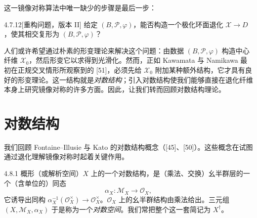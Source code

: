 这一镜像对称算法中唯一缺少的步骤是最后一步：

\begin{question}{4.7.12}[重构问题，版本 II]
给定 $(B,\mathcal{P},\varphi)$，能否构造一个极化环面退化 $\mathcal{X}\to D$，使其相交复形为 $(B,\mathcal{P},\varphi)$？
\end{question}

人们或许希望通过朴素的形变理论来解决这个问题：由数据 $(B,\mathcal{P},\varphi)$ 构造中心纤维 $\mathcal{X}_0$，然后形变它以求得到光滑化。然而，正如 Kawamata 与 Namikawa 最初在正规交叉情形所观察到的 [51]，必须先给 $\mathcal{X}_0$ 附加某种额外结构，它才具有良好的形变理论。这一结构就是\emph{对数结构}；引入对数结构使我们能够直接在退化纤维本身上研究镜像对称的许多方面。因此，让我们转而回顾对数结构理论。

\section{对数结构}
我们回顾 Fontaine--Illusie 与 Kato 的对数结构概念（[45]、[50]）。这些概念在试图通过退化理解镜像对称时起着关键作用。

\begin{definition}{4.8.1}
概形（或解析空间）$X$ 上的一个对数结构，是（乘法、交换）幺半群层的一个（含单位的）同态
\[
\alpha_X:\mathcal{M}_X\to\mathcal{O}_X,
\]
它诱导出同构 $\alpha_X^{-1}(\mathcal{O}_X^\times)\to\mathcal{O}_X^\times$。$\mathcal{O}_X$ 上的幺半群结构由乘法给出。三元组 $(X,\mathcal{M}_X,\alpha_X)$ 于是称为一个\emph{对数空间}。我们常把整个这一套简记为 $X^\dagger$。
\end{definition}
